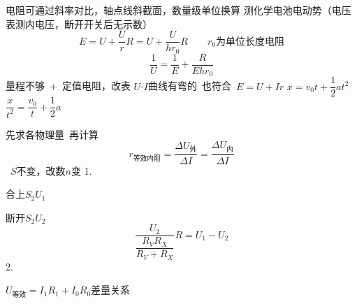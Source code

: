 电阻可通过斜率对比，轴点线斜截面，数量级单位换算 %
测化学电池电动势（电压表测内电压，断开开关后无示数）
\[
E=U+\frac{U}{r}R=U+\frac{U}{hr_0}R\qquad r_0\text{为单位长度电阻}
\]
\[
\frac1U=\frac1E+\frac{R}{Ehr_0}
\]
量程不够\ +\ 定值电阻，改表
$U$-$I$曲线有弯的\ 也符合\ $E=U+Ir$
$x=v_0t+\dfrac12at^2$\qquad $\dfrac{x}{t^2}=\dfrac{v_0}{t}+\dfrac12a$

先求各物理量\ 再计算
\[
r_{\text{等效内阻}}=\frac{\Delta U_{\text{外}}}{\Delta I}=\frac{\Delta U_{\text{内}}}{\Delta I}
\]
\ $S$不变，改数$n$变 %
1.

合上$S_2$\quad $U_1$

断开$S_2$\quad $U_2$
\[
\frac{U_2}{\dfrac{R_VR_X}{R_V+R_X}}R=U_1-U_2
\]
2.

$U_{\text{等效}}=I_1R_1+I_0R_0$\qquad 差量关系

